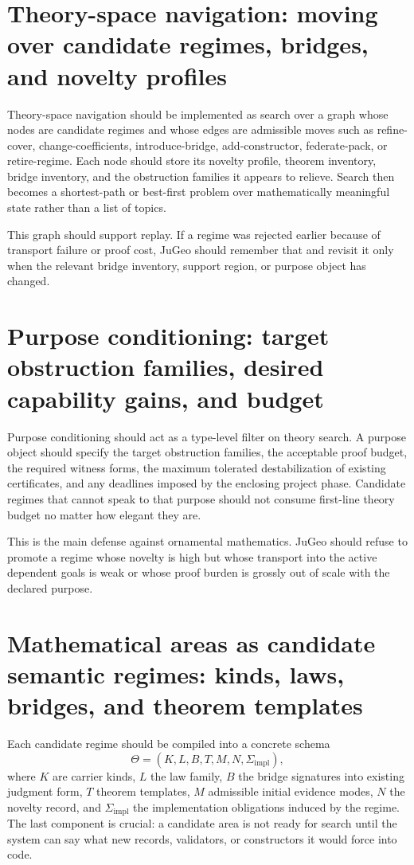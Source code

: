 \documentclass[11pt]{report}
\begin{document}
\section{Theory-space navigation: moving over candidate regimes, bridges, and novelty profiles}
Theory-space navigation should be implemented as search over a graph whose nodes are candidate regimes and whose edges are admissible moves such as refine-cover, change-coefficients, introduce-bridge, add-constructor, federate-pack, or retire-regime. Each node should store its novelty profile, theorem inventory, bridge inventory, and the obstruction families it appears to relieve. Search then becomes a shortest-path or best-first problem over mathematically meaningful state rather than a list of topics.

This graph should support replay. If a regime was rejected earlier because of transport failure or proof cost, JuGeo should remember that and revisit it only when the relevant bridge inventory, support region, or purpose object has changed.

\section{Purpose conditioning: target obstruction families, desired capability gains, and budget}
Purpose conditioning should act as a type-level filter on theory search. A purpose object should specify the target obstruction families, the acceptable proof budget, the required witness forms, the maximum tolerated destabilization of existing certificates, and any deadlines imposed by the enclosing project phase. Candidate regimes that cannot speak to that purpose should not consume first-line theory budget no matter how elegant they are.

This is the main defense against ornamental mathematics. JuGeo should refuse to promote a regime whose novelty is high but whose transport into the active dependent goals is weak or whose proof burden is grossly out of scale with the declared purpose.

\section{Mathematical areas as candidate semantic regimes: kinds, laws, bridges, and theorem templates}
Each candidate regime should be compiled into a concrete schema
\[
\Theta = (K, L, B, T, M, N, \Sigma_{\mathrm{impl}}),
\]
where $K$ are carrier kinds, $L$ the law family, $B$ the bridge signatures into existing judgment form, $T$ theorem templates, $M$ admissible initial evidence modes, $N$ the novelty record, and $\Sigma_{\mathrm{impl}}$ the implementation obligations induced by the regime. The last component is crucial: a candidate area is not ready for search until the system can say what new records, validators, or constructors it would force into code.
\end{document}
